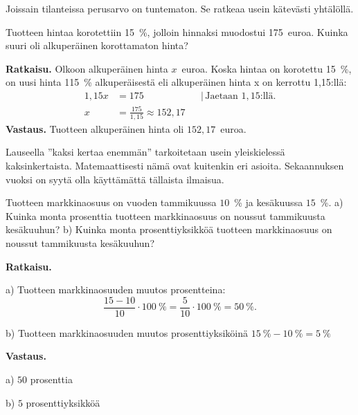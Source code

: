 Joissain tilanteissa perusarvo on tuntematon. Se ratkeaa usein kätevästi yhtälöllä.
\begin{esimerkki}
Tuotteen hintaa korotettiin 15~\%, jolloin hinnaksi muodostui 175~euroa. Kuinka suuri oli alkuperäinen korottamaton hinta?

\textbf{Ratkaisu.} 
Olkoon alkuperäinen hinta $x$~euroa. Koska hintaa on korotettu 15~\%, on uusi hinta 115~\% alkuperäisestä eli alkuperäinen hinta x on kerrottu 1,15:llä:
\begin{align*}
	1,15x	&= 175	&	&|\, \text{Jaetaan $1,15$:llä.} \\
	x	&= \frac{175}{1,15} \approx 152,17
\end{align*}
    \textbf{Vastaus.}
    Tuotteen alkuperäinen hinta oli $152,17$~euroa.
\end{esimerkki}

Lauseella ''kaksi kertaa enemmän'' tarkoitetaan usein yleiskielessä kaksinkertaista.
Matemaattisesti nämä ovat kuitenkin eri asioita.
Sekaannuksen vuoksi on syytä olla käyttämättä tällaista ilmaisua.


\begin{esimerkki}
    Tuotteen markkinaosuus on vuoden tammikuussa $10$~\% ja kesäkuussa $15$~\%.
    a) Kuinka monta prosenttia tuotteen markkinaosuus on noussut tammikuusta kesäkuuhun?
    b) Kuinka monta prosenttiyksikköä tuotteen markkinaosuus on noussut tammikuusta kesäkuuhun?

    \textbf{Ratkaisu.}
    
a) Tuotteen markkinaosuuden muutos prosentteina:
          \[
                \frac{15-10}{10} \cdot 100~\%= \frac{5}{10}\cdot 100~\% = 50~\%.
          \]
  
b) Tuotteen markkinaosuuden muutos prosenttiyksiköinä $15~\%-10~\%=5~\%$

\textbf{Vastaus.}

a) $50$ prosenttia

b) $5$ prosenttiyksikköä
\end{esimerkki}
